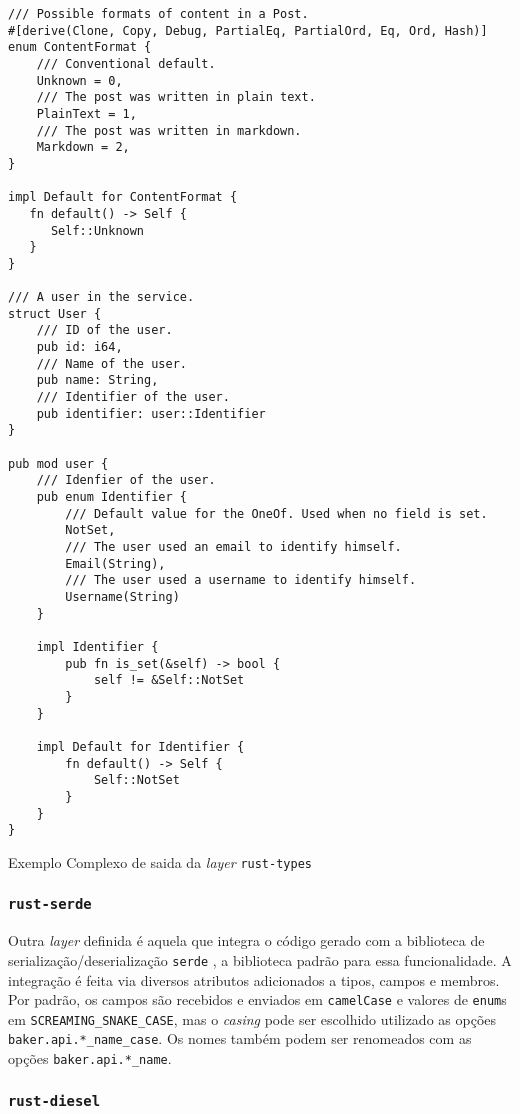 \begin{listing}
\begin{verbatim}
/// Possible formats of content in a Post.
#[derive(Clone, Copy, Debug, PartialEq, PartialOrd, Eq, Ord, Hash)]
enum ContentFormat {
    /// Conventional default.
    Unknown = 0,
    /// The post was written in plain text.
    PlainText = 1,
    /// The post was written in markdown.
    Markdown = 2,
}

impl Default for ContentFormat {
   fn default() -> Self {
      Self::Unknown
   }
}

/// A user in the service.
struct User {
    /// ID of the user.
    pub id: i64,
    /// Name of the user.
    pub name: String,
    /// Identifier of the user.
    pub identifier: user::Identifier
}

pub mod user {
    /// Idenfier of the user.
    pub enum Identifier {
        /// Default value for the OneOf. Used when no field is set.
        NotSet,
        /// The user used an email to identify himself.
        Email(String),
        /// The user used a username to identify himself.
        Username(String)
    }

    impl Identifier {
        pub fn is_set(&self) -> bool {
            self != &Self::NotSet
        }
    }

    impl Default for Identifier {
        fn default() -> Self {
            Self::NotSet
        }
    }
}
\end{verbatim}
\caption{Exemplo Complexo de saida da \textit{layer} \texttt{rust-types}}
\label{lst-rust-types-cplx-rust-out}
\end{listing}

\subsubsection{\texttt{rust-serde}}

Outra \textit{layer} definida é aquela que integra o código gerado com a biblioteca
de serialização/deserialização \texttt{serde} \cite{rust:serde}, a biblioteca padrão
para essa funcionalidade. A integração é feita via diversos atributos adicionados a
tipos, campos e membros. Por padrão, os campos são recebidos e enviados em \texttt{camelCase}
e valores de \texttt{enum}s em \texttt{SCREAMING\_SNAKE\_CASE}, mas o \textit{casing}
pode ser escolhido utilizado as opções \texttt{baker.api.*\_name\_case}. Os nomes também
podem ser renomeados com as opções \texttt{baker.api.*\_name}.

\subsubsection{\texttt{rust-diesel}}

